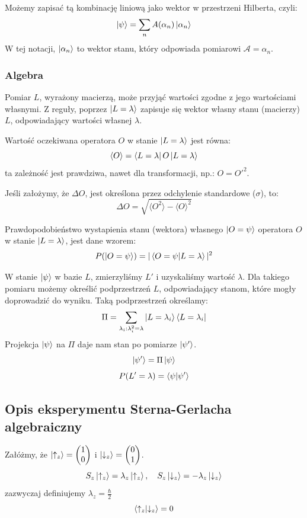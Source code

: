 \documentclass{../notatki}
\begin{document}
Możemy zapisać tą kombinację liniową jako wektor w przestrzeni Hilberta, czyli:
$$
\ket{\psi} = \sum_{n} A(\alpha_n) \ket{\alpha_n}
$$
W tej notacji, $\ket{\alpha_n}$ to wektor stanu, który odpowiada
pomiarowi $\mathcal{A} = \alpha_n$.

\subsubsection{Algebra}

Pomiar $L$, wyrażony macierzą, może przyjąć wartości zgodne z jego wartościami
własnymi. Z reguły, poprzez $\ket{L = \lambda}$ zapisuje się wektor własny
stanu (macierzy) $L$, odpowiadający wartości własnej $\lambda$.

Wartość oczekiwana operatora $O$ w stanie $\ket{L = \lambda}$ jest równa:
$$
\langle O \rangle = \bra{L = \lambda} O \ket{L = \lambda}
$$
ta zależność jest prawdziwa, nawet dla transformacji, np.: $O = O'^2$.

Jeśli założymy, że $\Delta O$, jest określona przez odchylenie
standardowe ($\sigma$), to:
$$
\Delta O = \sqrt{\langle O^2 \rangle - \langle O \rangle^2}
$$

Prawdopodobieństwo wystapienia stanu (wektora) własnego $\ket{O = \psi}$
operatora $O$ w stanie $\ket{L = \lambda}$, jest dane wzorem:
$$
P(\ket{O = \psi}) = |\braket{O = \psi}{L = \lambda}|^2
$$

W stanie $\ket{\psi}$ w bazie $L$, zmierzyliśmy $L'$ i uzyskaliśmy wartość
$\lambda$. Dla takiego pomiaru możemy określić podprzestrzeń $L$, odpowiadający
stanom, które mogły doprowadzić do wyniku. Taką podprzestrzeń określamy:
$$
\Pi = \sum_{\lambda_i : \lambda_i^2 = \lambda} \ket{L =
\lambda_i}\bra{L = \lambda_i}
$$
Projekcja $\ket{\psi}$ na $\Pi$ daje nam stan po pomiarze $\ket{\psi'}$.
$$
\ket{\psi'} = \Pi \ket{\psi}
$$
$$
P(L' = \lambda) = \bra{\psi} \ket{\psi'}
$$

\subsection{Opis eksperymentu Sterna-Gerlacha algebraiczny}

Załóżmy, że $\ket{\uparrow_z} =
\begin{pmatrix} 1 \\ 0
\end{pmatrix}$ i $\ket{\downarrow_z} =
\begin{pmatrix} 0 \\ 1
\end{pmatrix}$.
$$
S_z \ket{\uparrow_z} = \lambda_z \ket{\uparrow_z} , \quad S_z
\ket{\downarrow_z} = -\lambda_z \ket{\downarrow_z}
$$
zazwyczaj definiujemy $\lambda_z = \frac{\hbar}{2}$
$$
\braket{\uparrow_z}{\downarrow_z} = 0
$$
\end{document}
